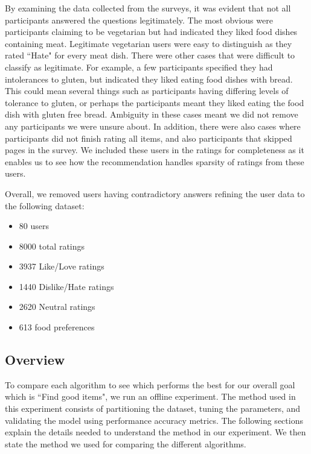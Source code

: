 
By examining the data collected from the surveys, it was evident that not all participants answered the questions legitimately. The most obvious were participants claiming to be vegetarian but had indicated they liked food dishes containing meat. Legitimate vegetarian users were easy to distinguish as they rated ``Hate" for every meat dish. There were other cases that were difficult to classify as legitimate. For example, a few participants specified they had intolerances to gluten, but indicated they liked eating food dishes with bread. This could mean several things such as participants having differing levels of tolerance to gluten, or perhaps the participants meant they liked eating the food dish with gluten free bread. Ambiguity in these cases meant we did not remove any participants we were unsure about. In addition, there were also cases where participants did not finish rating all items, and also participants that skipped pages in the survey. We included these users in the ratings for completeness as it enables us to see how the recommendation handles sparsity of ratings from these users. 

Overall, we removed users having contradictory answers refining the user data to the following dataset:
\begin{itemize}
	\item{80 users}
	\item{8000 total ratings}
	\item{3937 Like/Love ratings}
	\item{1440 Dislike/Hate ratings}
    \item{2620 Neutral ratings}
	\item{613 food preferences}
\end{itemize}

\subsection{Overview}

To compare each algorithm to see which performs the best for our overall goal which is ``Find good items", we run an offline experiment. The method used in this experiment consists of partitioning the dataset, tuning the parameters, and validating the model using performance accuracy metrics. The following sections explain the details needed to understand the method in our experiment. We then state the method we used for comparing the different algorithms. 


